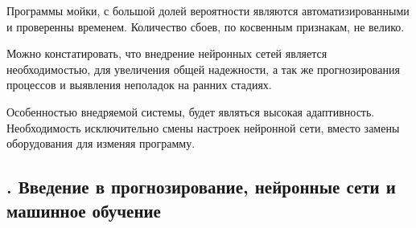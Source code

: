 {  \par \redline Программы мойки, с большой долей вероятности являются автоматизированными и проверенны временем. Количество сбоев, по косвенным признакам, не велико.
  
  \par \redline Можно констатировать, что внедрение нейронных сетей является необходимостью, для увеличения общей надежности, а так же прогнозирования процессов и выявления неполадок на ранних стадиях.  
  
  \par \redline Особенностью внедряемой системы, будет являться высокая адаптивность. Необходимость исключительно смены настроек нейронной сети, вместо замены оборудования для изменяя программу.
  
  \par 
}

\subtitlespace

\subsection*{  
  \gostTitleFont
  \redline
  \thechaptercntr .\thesubchaptercntr \spc
  Введение в прогнозирование, нейронные сети и машинное обучение
} \addtocounter{subchaptercntr}{1}

\subtitlespace

